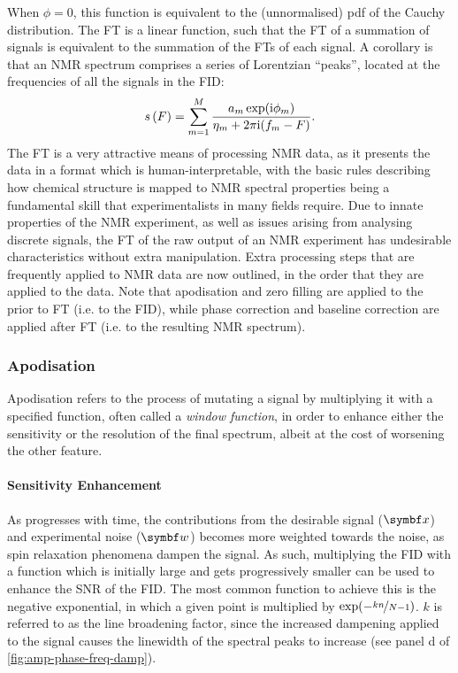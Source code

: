 When $\phi = 0$, this function is equivalent to the (unnormalised) \ac{pdf}
of the Cauchy distribution. The \ac{FT} is a linear function, such that the
\ac{FT} of a summation of signals is equivalent to the summation of the
\acp{FT} of each signal. A corollary is that an \ac{NMR} spectrum comprises a
series of Lorentzian ``peaks'', located at the frequencies of all the signals
in the \ac{FID}:
\begin{equation}
    s\left(F\right) = \sum_{m=1}^{M}
    \frac{a_m \exp(\mathrm{i} \phi_m)}
    {\eta_m + 2 \pi \mathrm{i} (f_m - F)}.
    \label{eq:ft-summation}
\end{equation}
The \ac{FT} is a very attractive means of processing \ac{NMR} data, as it
presents the data in a format which is human-interpretable, with the basic
rules describing how chemical structure is mapped to \ac{NMR} spectral
properties being a fundamental skill that experimentalists in many fields
require\cite{Hore2015b}. Due to innate properties of the \ac{NMR} experiment,
as well as issues arising from analysing discrete signals, the \ac{FT} of
the raw output of an \ac{NMR} experiment has undesirable
characteristics without extra manipulation. Extra processing
steps that are frequently applied to \ac{NMR} data are now outlined, in the
order that they are applied to the data. Note that apodisation and zero filling
are applied to the prior to \ac{FT} (i.e. to the \ac{FID}), while phase
correction and baseline correction are applied after \ac{FT} (i.e. to the
resulting \ac{NMR} spectrum).

\subsubsection{Apodisation}
Apodisation refers to the process of mutating a signal by multiplying it with a
specified function, often called a \emph{window function}\cite[Section
3.2.7]{Claridge2016}, in order to enhance
either the sensitivity or the resolution of the final spectrum, albeit
at the cost of worsening the other feature.

\paragraph{Sensitivity Enhancement} As  progresses with time, the
contributions from the desirable signal ($\bx$) and experimental noise ($\bw$)
becomes more
weighted towards the noise, as spin relaxation phenomena dampen the signal. As
such, multiplying the \ac{FID} with a function which is initially large and
gets progressively smaller can be used to enhance the \ac{SNR} of the
\ac{FID}. The most common function to achieve this is the negative exponential,
in which a given point is multiplied by $\exp(-\nicefrac{k n}{N - 1})$.
$k$ is referred to as the line broadening factor, since the increased dampening
applied to the signal causes the linewidth of the spectral peaks to increase
(see panel d of \cref{fig:amp-phase-freq-damp}).

